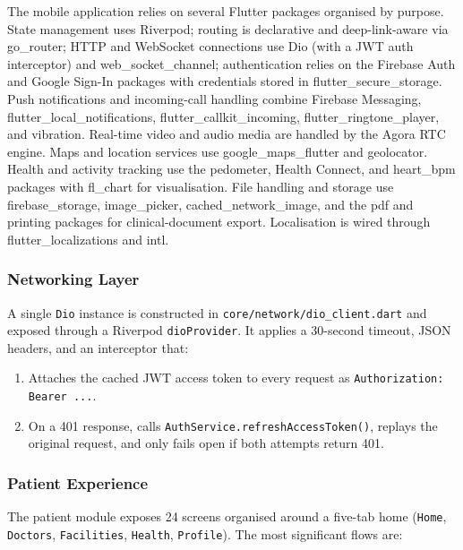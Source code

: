 The mobile application relies on several Flutter packages organised by purpose. State management uses Riverpod; routing is declarative and deep-link-aware via go\_router; HTTP and WebSocket connections use Dio (with a JWT auth interceptor) and web\_socket\_channel; authentication relies on the Firebase Auth and Google Sign-In packages with credentials stored in flutter\_secure\_storage. Push notifications and incoming-call handling combine Firebase Messaging, flutter\_local\_notifications, flutter\_callkit\_incoming, flutter\_ringtone\_player, and vibration. Real-time video and audio media are handled by the Agora RTC engine. Maps and location services use google\_maps\_flutter and geolocator. Health and activity tracking use the pedometer, Health Connect, and heart\_bpm packages with fl\_chart for visualisation. File handling and storage use firebase\_storage, image\_picker, cached\_network\_image, and the pdf and printing packages for clinical-document export. Localisation is wired through flutter\_localizations and intl.

\subsubsection*{Networking Layer}

A single \texttt{Dio} instance is constructed in \texttt{core/network/dio\_client.dart} and exposed through a Riverpod \texttt{dioProvider}. It applies a 30-second timeout, JSON headers, and an interceptor that:

\begin{enumerate}
  \item Attaches the cached JWT access token to every request as \texttt{Authorization: Bearer ...}.
  \item On a 401 response, calls \texttt{AuthService.refreshAccessToken()}, replays the original request, and only fails open if both attempts return 401.
\end{enumerate}

\subsubsection*{Patient Experience}

The patient module exposes 24 screens organised around a five-tab home (\texttt{Home}, \texttt{Doctors}, \texttt{Facilities}, \texttt{Health}, \texttt{Profile}). The most significant flows are:

